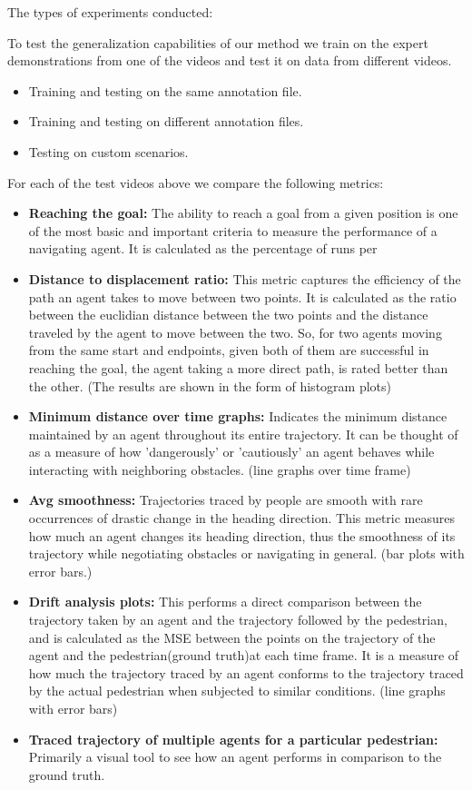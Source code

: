 The types of experiments conducted:

To test the generalization capabilities of our method we train on the expert demonstrations from one of the videos and test it on data from different videos.

\begin{itemize}
        \item Training and testing on the same annotation file.
        \item Training and testing on different annotation files.
        \item Testing on custom scenarios.
\end{itemize}

For each of the test videos above we compare the following metrics:
\begin{itemize}
        \item \textbf{Reaching the goal:} The ability to reach a goal from a given position is one of the most basic and important criteria to measure the performance of a navigating agent. It is calculated as the percentage of runs per 
        \item \textbf{Distance to displacement ratio:} This metric captures the efficiency of the path an agent takes to move between two points. It is calculated as the ratio between the euclidian distance between the two points and the distance traveled by the agent to move between the two. So, for two agents moving from the same start and endpoints, given both of them are successful in reaching the goal, the agent taking a more direct path, is rated better than the other. (The results are shown in the form of histogram plots)
        \item \textbf{Minimum distance over time graphs:} Indicates the minimum distance maintained by an agent throughout its entire trajectory. It can be thought of as a measure of how 'dangerously' or 'cautiously' an agent behaves while interacting with neighboring obstacles. (line graphs over time frame)
        \item \textbf{Avg smoothness:} Trajectories traced by people are smooth with rare occurrences of drastic change in the heading direction. This metric measures how much an agent changes its heading direction, thus the smoothness of its trajectory while negotiating obstacles or navigating in general. (bar plots with error bars.)
        \item \textbf{Drift analysis plots: }This performs a direct comparison between the trajectory taken by an agent and the trajectory followed by the pedestrian, and is calculated as the MSE between the points on the trajectory of the agent and the pedestrian(ground truth)at each time frame. It is a measure of how much the trajectory traced by an agent conforms to the trajectory traced by the actual pedestrian when subjected to similar conditions. (line graphs with error bars)
        \item \textbf{Traced trajectory of multiple agents for a particular pedestrian:} Primarily a visual tool to see how an agent performs in comparison to the ground truth.
\end{itemize}
